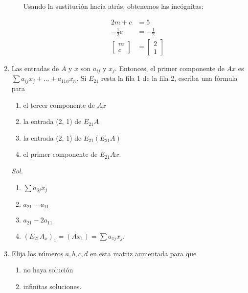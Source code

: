 \begin{enumerate}
\begin{enumerate}
		            Usando la sustitución hacia atrás, obtenemos las incógnitas:

		            \begin{align*}
			             & 2m+c            & =5             \\
			             & -\frac{1}{2}c   & =-\frac{1}{2}  \\
			             & \begin{bmatrix}
				               m \\c
			               \end{bmatrix} & = \begin{bmatrix}
				                                 2 \\1
			                                 \end{bmatrix}
		            \end{align*}
	      \end{enumerate}


	\item Las entradas de $A$ y $x$ son $a_{ij}$ y $x_{j}$. Entonces, el primer componente de $Ax$ es $\sum a_{ij} x_{j} + \dots + a_{11n}x_{n}$. Si $E_{21}$ resta la fila 1 de la fila 2, escriba una fórmula para

	      \begin{enumerate}
		      \item el tercer componente de $Ax$
		      \item la entrada (2, 1) de $E_{21}A$
		      \item la entrada (2, 1) de $E_{21} (E_{21}A)$
		      \item el primer componente de $E_{21} Ax$.
	      \end{enumerate}

	      \textit{Sol. }

	      \begin{enumerate}
		      \item $\sum a_{3j}x_{j}$
		      \item $a_{21}-a_{11}$
		      \item $a_{21}-2a_{11}$
		      \item $(E_{21}A_{x})_1= (Ax_{1}) =\sum a_{1j}x_{j}. $
	      \end{enumerate}

	\item Elija los números $a, b, c, d$ en esta matriz aumentada para que
	      \begin{enumerate}
		      \item no haya solución
		      \item infinitas soluciones.
	      \end{enumerate}


\end{enumerate}
